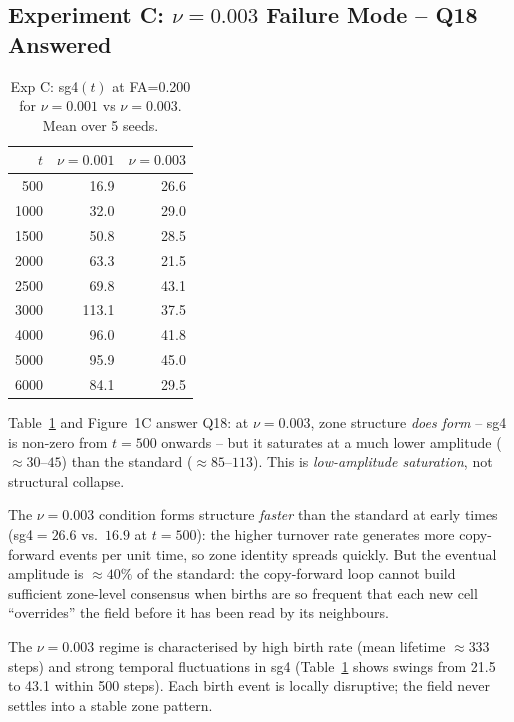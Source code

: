 \documentclass[11pt,a4paper]{article}
\begin{document}
\subsection{Experiment C: $\nu=0.003$ Failure Mode -- Q18 Answered}

\begin{table}[h]
\centering
\caption{Exp C: sg4$(t)$ at FA=0.200 for $\nu=0.001$ vs $\nu=0.003$.  Mean over 5 seeds.}
\label{tab:expC}
\begin{tabular}{r|rr}
\toprule
$t$ & $\nu=0.001$ & $\nu=0.003$ \\
\midrule
 500 &  16.9 &  26.6 \\
1000 &  32.0 &  29.0 \\
1500 &  50.8 &  28.5 \\
2000 &  63.3 &  21.5 \\
2500 &  69.8 &  43.1 \\
3000 & 113.1 &  37.5 \\
4000 &  96.0 &  41.8 \\
5000 &  95.9 &  45.0 \\
6000 &  84.1 &  29.5 \\
\bottomrule
\end{tabular}
\end{table}

Table~\ref{tab:expC} and Figure~1C answer Q18: at $\nu=0.003$, zone structure
\emph{does form} -- sg4 is non-zero from $t=500$ onwards -- but it saturates at a much
lower amplitude ($\approx 30$--$45$) than the standard ($\approx 85$--$113$).  This is
\emph{low-amplitude saturation}, not structural collapse.

The $\nu=0.003$ condition forms structure \emph{faster} than the standard at early times
(sg4$=26.6$ vs.\ $16.9$ at $t=500$): the higher turnover rate generates more copy-forward
events per unit time, so zone identity spreads quickly.  But the eventual amplitude is
$\approx 40\%$ of the standard: the copy-forward loop cannot build sufficient
zone-level consensus when births are so frequent that each new cell ``overrides'' the
field before it has been read by its neighbours.

The $\nu=0.003$ regime is characterised by high birth rate (mean lifetime $\approx 333$
steps) and strong temporal fluctuations in sg4 (Table~\ref{tab:expC} shows swings from
21.5 to 43.1 within 500 steps).  Each birth event is locally disruptive; the field never
settles into a stable zone pattern.

\end{document}
